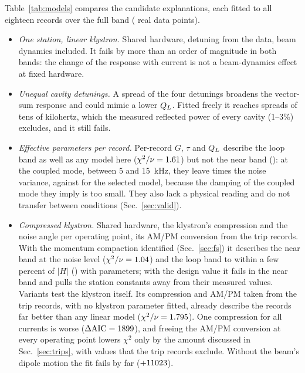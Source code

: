 Table~\ref{tab:models} compares the candidate explanations, each fitted to all eighteen records over the full band (\nPoints{} real data points).
\begin{itemize}
\item \emph{One station, linear klystron.} Shared hardware, detuning from the data, beam dynamics included. It fails by more than an order of magnitude in both bands: the change of the response with current is not a beam-dynamics effect at fixed hardware.
\item \emph{Unequal cavity detunings.} A spread of the four detunings broadens the vector-sum response and could mimic a lower $Q_L$. Fitted freely it reaches spreads of tens of kilohertz, which the measured reflected power of every cavity (1--3\%) excludes, and it still fails.
\item \emph{Effective parameters per record.} Per-record $G$, $\tau$ and $Q_L$ describe the loop band as well as any model here ($\chi^2/\nu=1.61$) but not the near band (\chiBeamEff): at the coupled mode, between 5 and \SI{15}{kHz}, they leave \chiEffMode{} times the noise variance, against \chiSelMode{} for the selected model, because the damping of the coupled mode they imply is too small. They also lack a physical reading and do not transfer between conditions (Sec.~\ref{sec:valid}).
\item \emph{Compressed klystron.} Shared hardware, the klystron's compression and the noise angle per operating point, its AM/PM conversion from the trip records. With the momentum compaction identified (Sec.~\ref{sec:fs}) it describes the near band at the noise level ($\chi^2/\nu=1.04$) and the loop band to within a few percent of $|H|$ (\chiWideSel) with \nparSel{} parameters; with the design value it fails in the near band and pulls the station constants away from their measured values. Variants test the klystron itself. Its compression and AM/PM taken from the trip records, with no klystron parameter fitted, already describe the records far better than any linear model ($\chi^2/\nu=1.795$). One compression for all currents is worse ($\Delta\mathrm{AIC}=1899$), and freeing the AM/PM conversion at every operating point lowers $\chi^2$ only by the amount discussed in Sec.~\ref{sec:trips}, with values that the trip records exclude. Without the beam's dipole motion the fit fails by far ($+11023$).
\end{itemize}

